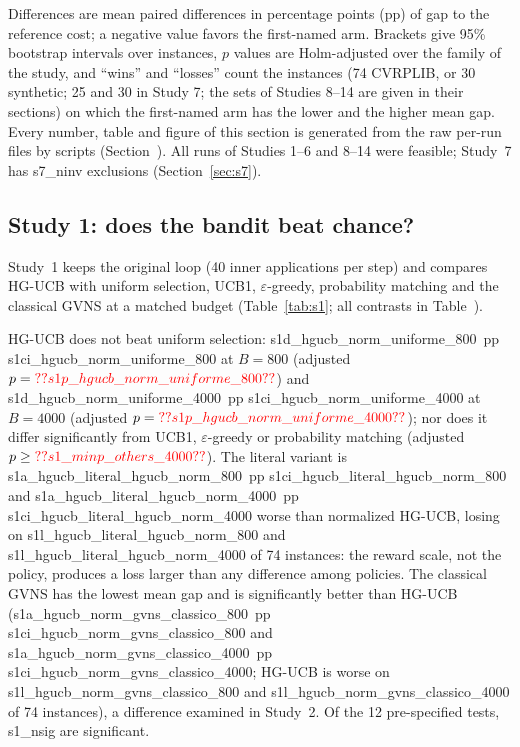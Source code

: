 Differences are mean paired differences in percentage points (pp) of gap to the reference cost; a negative value favors the first-named arm. Brackets give 95\% bootstrap intervals over instances, $p$ values are Holm-adjusted over the family of the study, and ``wins'' and ``losses'' count the instances (74 CVRPLIB, or 30 synthetic; 25 and 30 in Study 7; the sets of Studies 8--14 are given in their sections) on which the first-named arm has the lower and the higher mean gap. Every number, table and figure of this section is generated from the raw per-run files by scripts (Section~). All runs of Studies 1--6 and 8--14 were feasible; Study~7 has \num{s7_ninv} exclusions (Section~\ref{sec:s7}).

\subsection{Study 1: does the bandit beat chance?}\label{sec:s1}
Study~1 keeps the original loop (40 inner applications per step) and compares HG-UCB with uniform selection, UCB1, $\varepsilon$-greedy, probability matching and the classical GVNS at a matched budget (Table~\ref{tab:s1}; all contrasts in Table~).



HG-UCB does not beat uniform selection: \num{s1d_hgucb_norm_uniforme_800}~pp \num{s1ci_hgucb_norm_uniforme_800} at $B=800$ (adjusted $p=\num{s1p_hgucb_norm_uniforme_800}$) and \num{s1d_hgucb_norm_uniforme_4000}~pp \num{s1ci_hgucb_norm_uniforme_4000} at $B=4000$ (adjusted $p=\num{s1p_hgucb_norm_uniforme_4000}$); nor does it differ significantly from UCB1, $\varepsilon$-greedy or probability matching (adjusted $p\ge\num{s1_minp_others_4000}$). The literal variant is \num{s1a_hgucb_literal_hgucb_norm_800}~pp \num{s1ci_hgucb_literal_hgucb_norm_800} and \num{s1a_hgucb_literal_hgucb_norm_4000}~pp \num{s1ci_hgucb_literal_hgucb_norm_4000} worse than normalized HG-UCB, losing on \num{s1l_hgucb_literal_hgucb_norm_800} and \num{s1l_hgucb_literal_hgucb_norm_4000} of 74 instances: the reward scale, not the policy, produces a loss larger than any difference among policies. The classical GVNS has the lowest mean gap and is significantly better than HG-UCB (\num{s1a_hgucb_norm_gvns_classico_800}~pp \num{s1ci_hgucb_norm_gvns_classico_800} and \num{s1a_hgucb_norm_gvns_classico_4000}~pp \num{s1ci_hgucb_norm_gvns_classico_4000}; HG-UCB is worse on \num{s1l_hgucb_norm_gvns_classico_800} and \num{s1l_hgucb_norm_gvns_classico_4000} of 74 instances), a difference examined in Study~2. Of the 12 pre-specified tests, \num{s1_nsig} are significant.

